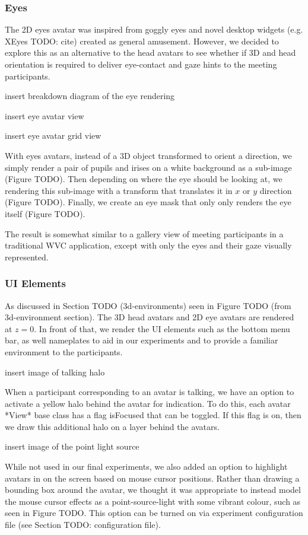 \subsubsection{Eyes}

The 2D eyes avatar was inspired from goggly eyes and novel desktop widgets (e.g. XEyes TODO: cite) created as general amusement. However, we decided to explore this as an alternative to the head avatars to see whether if 3D and head orientation is required to deliver eye-contact and gaze hints to the meeting participants. 

insert breakdown diagram of the eye rendering

insert eye avatar view

insert eye avatar grid view

With eyes avatars, instead of a 3D object transformed to orient a direction, we simply render a pair of pupils and irises on a white background as a sub-image (Figure TODO). Then depending on where the eye should be looking at, we rendering this sub-image with a transform that translates it in $x$ or $y$ direction (Figure TODO). Finally, we create an eye mask that only only renders the eye itself (Figure TODO).

The result is somewhat similar to a gallery view of meeting participants in a traditional WVC application, except with only the eyes and their gaze visually represented.

\subsubsection{UI Elements}

As discussed in Section TODO (3d-environments) seen in Figure TODO (from 3d-environment section). The 3D head avatars and 2D eye avatars are rendered at $z=0$. In front of that, we render the UI elements such as the bottom menu bar, as well nameplates to aid in our experiments and to provide a familiar environment to the participants.

insert image of talking halo

When a participant corresponding to an avatar is talking, we have an option to activate a yellow halo behind the avatar for indication. To do this, each avatar *View* base class has a flag isFocused that can be toggled. If this flag is on, then we draw this additional halo on a layer behind the avatars.

insert image of the point light source

While not used in our final experiments, we also added an option to highlight avatars in on the screen based on mouse cursor positions. Rather than drawing a bounding box around the avatar, we thought it was appropriate to instead model the mouse cursor effects as a point-source-light with some vibrant colour, such as seen in Figure TODO. This option can be turned on via experiment configuration file (see Section TODO: configuration file). 

